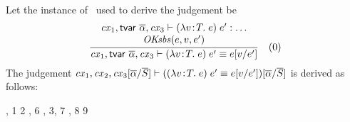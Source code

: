 \begin{bycase}
\Case{\Rthabs}\\
Let the instance of \Rthabs\ used to derive the judgement be
\[
\frac{\begin{array}{c}\mathit{cx}_1,\mathsf{tvar}\ \overline{\alpha},\mathit{cx}_3\vdash(\lambda v\!:\!T.\;e)\;e':\ldots\\\mathit{OKsbs}(e,v,e')\end{array}}{\mathit{cx}_1,\mathsf{tvar}\ \overline{\alpha},\mathit{cx}_3\vdash(\lambda v\!:\!T.\;e)\;e'\equiv e[v/e']}\quad\mbox{(0)}
\]
The judgement
$\mathit{cx}_1,\mathit{cx}_2,\mathit{cx}_3[\overline{\alpha}/\overline{S}]\vdash((\lambda v\!:\!T.\;e)\;e'\equiv e[v/e'])[\overline{\alpha}/\overline{S}]$
is derived as follows:
\begin{derivation}
     {\indhyp, 1}
     {2}
     {, }
     {6}
     {\Rthabs, 3, 7}
     {, 8}
     {9}
\end{derivation}


\end{bycase}
